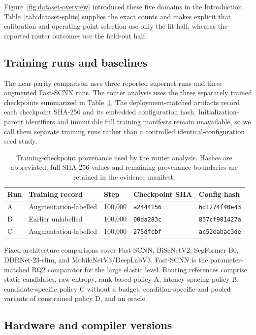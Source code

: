 \documentclass[a4paper,review,12pt]{elsarticle}
\begin{document}
Figure~\ref{fig:dataset-overview} introduced these five domains in the Introduction. Table~\ref{tab:dataset-splits} supplies the exact counts and makes explicit that calibration and operating-point selection use only the fit half, whereas the reported router outcomes use the held-out half.

\subsection{Training runs and baselines}

The near-parity comparison uses three reported supernet runs and three augmented Fast-SCNN runs. The router analysis uses the three separately trained checkpoints summarized in Table~\ref{tab:provenance}. The deployment-matched artifacts record each checkpoint SHA-256 and its embedded configuration hash. Initialization-parent identifiers and immutable full training manifests remain unavailable, so we call them separate training runs rather than a controlled identical-configuration seed study.

\begin{table}[H]
\centering
\caption{Training-checkpoint provenance used by the router analysis. Hashes are abbreviated; full SHA-256 values and remaining provenance boundaries are retained in the evidence manifest.}
\label{tab:provenance}
\small
\begin{tabularx}{\textwidth}{@{}lXlll@{}}
\toprule
Run & Training record & Step & Checkpoint SHA & Config hash \\
\midrule
A & Augmentation-labelled & 100,000 & \texttt{a2444156} & \texttt{6d1274f40e43} \\
B & Earlier unlabelled & 100,000 & \texttt{00da283c} & \texttt{837cf981427a} \\
C & Augmentation-labelled & 100,000 & \texttt{275dfcbf} & \texttt{ac52eabac3de} \\
\bottomrule
\end{tabularx}
\end{table}

Fixed-architecture comparisons cover Fast-SCNN, BiSeNetV2, SegFormer-B0, DDRNet-23-slim, and MobileNetV3/DeepLabV3. Fast-SCNN is the parameter-matched RQ2 comparator for the large elastic level. Routing references comprise static candidates, raw entropy, rank-based policy A, latency-spacing policy B, candidate-specific policy C without a budget, condition-specific and pooled variants of constrained policy D, and an oracle.

\subsection{Hardware and compiler versions}
\end{document}

